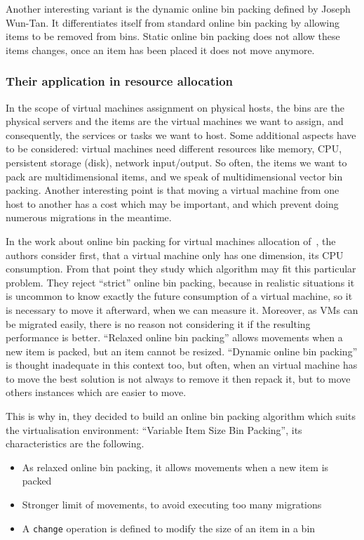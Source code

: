 Another interesting variant is the dynamic online bin packing defined by Joseph
Wun-Tan.  It differentiates itself from standard online bin packing by allowing
items to be removed from bins. Static online bin packing does not allow these
items changes, once an item has been placed it does not move anymore.

\subsubsection{Their application in resource allocation}

In the scope of virtual machines assignment on physical hosts, the bins are the
physical servers and the items are the virtual machines we want to assign,
and consequently, the services or tasks we want to host. Some additional aspects
have to be considered: virtual machines need different resources like memory,
CPU, persistent storage (disk), network input/output. So often, the items we
want to pack are multidimensional items, and we speak of multidimensional
vector bin packing. Another interesting point is that moving a virtual machine
from one host to another has a cost which may be important, and which prevent 
doing numerous migrations in the meantime.

In the work about online bin packing for virtual machines allocation
of~\cite*{reassignmentVisbp}, the authors consider first, that a virtual
machine only has one dimension, its CPU consumption. From that point they study
which algorithm may fit this particular problem. They reject “strict” online
bin packing, because in realistic situations it is uncommon to know exactly
the future consumption of a virtual machine, so it is necessary to move it
afterward, when we can measure it. Moreover, as VMs can be migrated easily,
there is no reason not considering it if the resulting performance is better.
“Relaxed online bin packing” allows movements when a new item is packed, but
an item cannot be resized. “Dynamic online bin packing” is thought inadequate
in this context too, but often, when an virtual machine has to move the best
solution is not always to remove it then repack it, but to move others instances
which are easier to move.

This is why in\cite{reassignmentVisbp}, they decided to build an online bin
packing algorithm which suits the virtualisation environment: “Variable Item
Size Bin Packing”, its characteristics are the following.

\begin{itemize}
	\item{As relaxed online bin packing, it allows movements when a new item is packed}
	\item{Stronger limit of movements, to avoid executing too many migrations}
	\item{A \texttt{change} operation is defined to modify the size of an item in a bin}
\end{itemize}

